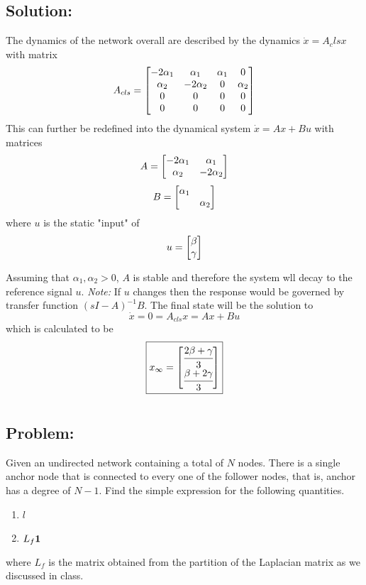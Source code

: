 \documentclass[]{article}
\numberwithin{equation}{section}
\begin{document}
\subsection*{Solution:}
The dynamics of the network overall are described by the dynamics $\dot{x} = A_cls x$ with matrix \[
    A_{cls} = \mqty[
        -2 \alpha_1 & \alpha_1 & \alpha_1 &0\\
        \alpha_2 & - 2 \alpha_2 & 0 & \alpha_2\\
        0  & 0 & 0 & 0\\
        0  & 0 & 0 & 0
    ]
\] This can further be redefined into the dynamical system $\dot{x} = A x + B u$ with matrices \[
    A = \mqty[
        -2 \alpha_1 & \alpha_1\\
        \alpha_2    & -2 \alpha_2
    ]
\] \[
    B = \mqty[\dmat{
        \alpha_1,
        \alpha_2
    }]
\] where $u$ is the static "input" of \[
    u = \mqty[
        \beta\\
        \gamma
    ]
\]

Assuming that $\alpha_1, \alpha_2 > 0$, $A$ is stable and therefore the system wll decay to the reference signal $u$.
\emph{Note:} If $u$ changes then the response would be governed by transfer function $(s I - A)^{-1} B$.
The final state will be the solution to \[
    \dot{x} = 0 = A_{cls} x = A x + B u
\] which is calculated to be \[\boxed{
    x_{\infty} = \mqty[
        \cfrac{2 \beta + \gamma}{3}\\
        \cfrac{\beta + 2 \gamma}{3}
    ]
}\]
    

\newpage
\section{}
\subsection*{Problem:}
Given an undirected network containing a total of $N$ nodes. 
There is a single anchor node that is connected to every one of the follower nodes, that is, anchor has a degree of $N-1$. 
Find the simple expression for the following quantities.
\begin{enumerate}
    \item $l$
    \item $L_f \vb{1}$
\end{enumerate}
where $L_f$ is the matrix obtained from the partition of the Laplacian matrix as we discussed in class.
\end{document}
